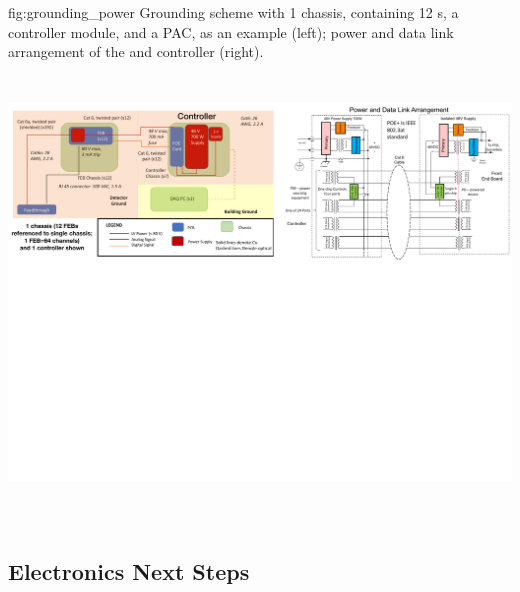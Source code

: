 \begin{dunefigure}
 {fig:grounding_power}
 {Grounding scheme with 1 chassis, containing 12 s, a controller module, and a  PAC, as an example (left); power and data link arrangement of the  and controller (right).}
\includegraphics[height=4.8in]{graphics/pds-grounding-power.pdf} 
\vspace{-7.1cm}
\end{dunefigure}



\subsection{Electronics Next Steps}

